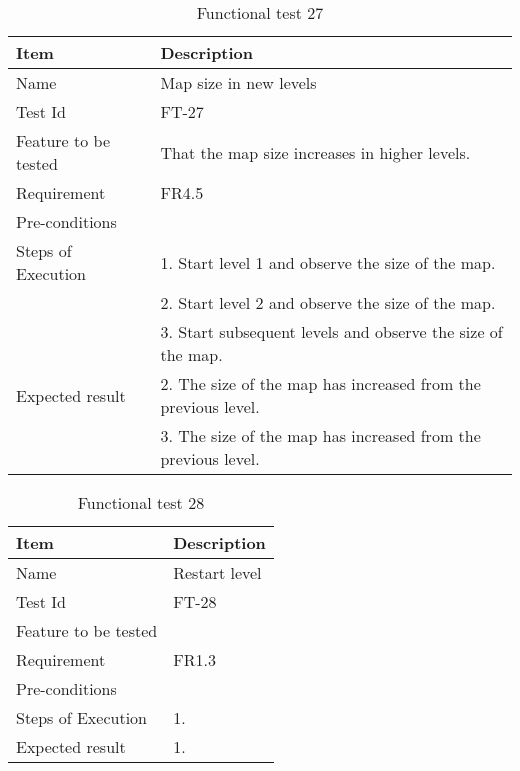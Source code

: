 \begin{table}[H]
\centering
	\begin{tabular}{ l | p{8cm} }
		\hline
		{\bf Item} & {\bf Description} \\ \hline
		Name & Map size in new levels \\ 
		Test Id & FT-27 \\ 
		Feature to be tested & That the map size increases in higher levels. \\ 
		Requirement & FR4.5 \\ 
		Pre-conditions & \\ 
		Steps of Execution & 1. Start level 1 and observe the size of the map. \\
		& 2. Start level 2 and observe the size of the map. \\
		& 3. Start subsequent levels and observe the size of the map. \\
		Expected result & 2. The size of the map has increased from the previous level. \\
		& 3. The size of the map has increased from the previous level. \\
	\end{tabular}
	\caption{Functional test 27}
\end{table}

\begin{table}[H]
\centering
	\begin{tabular}{ l | p{8cm} }
		\hline
		{\bf Item} & {\bf Description} \\ \hline
		Name & Restart level \\ 
		Test Id & FT-28 \\ 
		Feature to be tested & \\ 
		Requirement & FR1.3 \\ 
		Pre-conditions & \\ 
		Steps of Execution & 1.  \\
		Expected result & 1. \\
	\end{tabular}
	\caption{Functional test 28}
\end{table}

